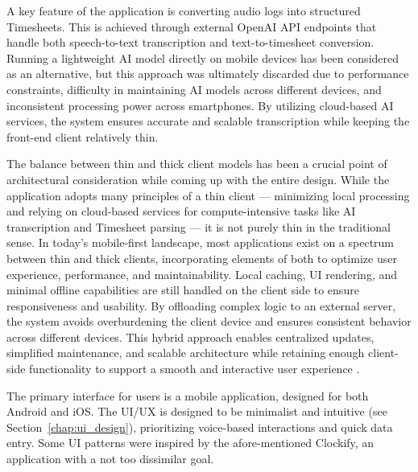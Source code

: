 \documentclass[
  digital,     %
  oneside,     %
  nosansbold,  %
  nocolorbold, %
  lof,         %
  lot,         %
]{fithesis4}
\begin{document}
A key feature of the application is converting audio logs into structured Timesheets. This is achieved through external OpenAI \gls{API} endpoints that handle both speech-to-text transcription and text-to-timesheet conversion. Running a lightweight \gls{AI} model directly on mobile devices has been considered as an alternative, but this approach was ultimately discarded due to performance constraints, difficulty in maintaining \gls{AI} models across different devices, and inconsistent processing power across smartphones. By utilizing cloud-based \gls{AI} services, the system ensures accurate and scalable transcription while keeping the front-end client relatively thin.

The balance between thin and thick client models has been a crucial point of architectural consideration while coming up with the entire design. While the application adopts many principles of a thin client --- minimizing local processing and relying on cloud-based services for compute-intensive tasks like \gls{AI} transcription and Timesheet parsing --- it is not purely thin in the traditional sense. In today's mobile-first landscape, most applications exist on a spectrum between thin and thick clients, incorporating elements of both to optimize user experience, performance, and maintainability. Local caching, \gls{UI} rendering, and minimal offline capabilities are still handled on the client side to ensure responsiveness and usability. By offloading complex logic to an external server, the system avoids overburdening the client device and ensures consistent behavior across different devices. This hybrid approach enables centralized updates, simplified maintenance, and scalable architecture while retaining enough client-side functionality to support a smooth and interactive user experience \cite{distributedSystems}.

The primary interface for users is a mobile application, designed for both Android and \gls{iOS}. The \acrshort{UI}/\acrshort{UX} is designed to be minimalist and intuitive (see Section~\ref{chap:ui_design}), prioritizing voice-based interactions and quick data entry. Some \gls{UI} patterns were inspired by the afore-mentioned Clockify, an application with a not too dissimilar goal.
\end{document}
